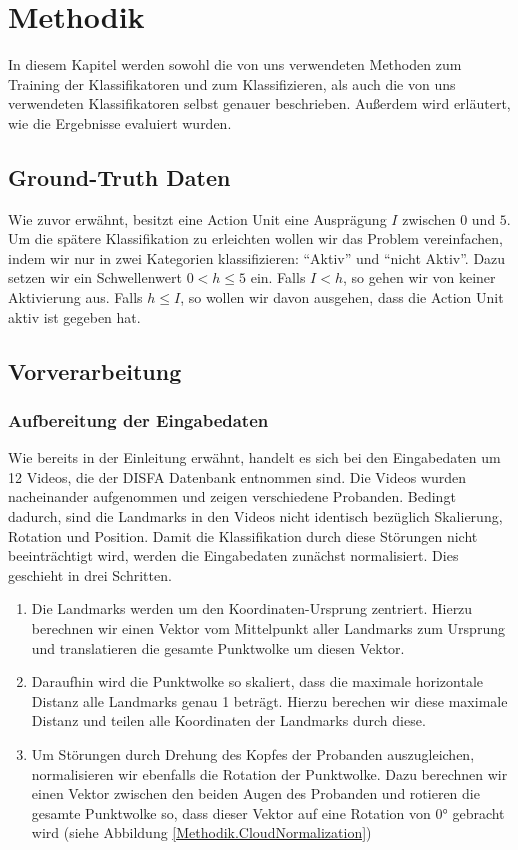 \chapter{Methodik}\label{ch:methodik}
In diesem Kapitel werden sowohl die von uns verwendeten Methoden zum Training der Klassifikatoren und zum Klassifizieren,
als auch die von uns verwendeten Klassifikatoren selbst genauer beschrieben. Außerdem wird erläutert, wie die Ergebnisse
evaluiert wurden.

\section{Ground-Truth Daten}
Wie zuvor erwähnt, besitzt eine Action Unit eine Ausprägung $I$ zwischen $0$ und $5$. Um die spätere Klassifikation zu erleichten wollen wir das Problem vereinfachen, indem wir nur in zwei Kategorien klassifizieren: "`Aktiv"' und "`nicht Aktiv"'. Dazu setzen wir ein Schwellenwert $0<h\leq5$ ein. Falls $I<h$, so gehen wir von keiner Aktivierung aus. Falls $h\leq I$, so wollen wir davon ausgehen, dass die Action Unit aktiv ist gegeben hat.
\section{Vorverarbeitung}
\subsection{Aufbereitung der Eingabedaten}\label{Methodik.Aufbereitung}
Wie bereits in der Einleitung erwähnt, handelt es sich bei den Eingabedaten um 12 Videos, die der DISFA Datenbank entnommen sind.
Die Videos wurden nacheinander aufgenommen und zeigen verschiedene Probanden. Bedingt dadurch, sind die Landmarks
in den Videos nicht identisch bezüglich Skalierung, Rotation und Position.\newline
Damit die Klassifikation durch diese Störungen nicht beeinträchtigt wird, werden die Eingabedaten zunächst normalisiert. Dies geschieht
in drei Schritten.
\begin{enumerate}
  \item Die Landmarks werden um den Koordinaten-Ursprung zentriert. Hierzu berechnen wir einen Vektor vom Mittelpunkt aller Landmarks zum Ursprung und translatieren
        die gesamte Punktwolke um diesen Vektor.
  \item Daraufhin wird die Punktwolke so skaliert, dass die maximale horizontale Distanz alle Landmarks genau 1 beträgt. Hierzu berechen wir diese maximale Distanz und
        teilen alle Koordinaten der Landmarks durch diese.
  \item Um Störungen durch Drehung des Kopfes der Probanden auszugleichen, normalisieren wir ebenfalls die Rotation der Punktwolke. Dazu berechnen wir einen Vektor
    zwischen den beiden Augen des Probanden und rotieren die gesamte Punktwolke so, dass dieser Vektor auf eine Rotation von 0° gebracht wird (siehe Abbildung \ref{Methodik.CloudNormalization})
\end{enumerate}


